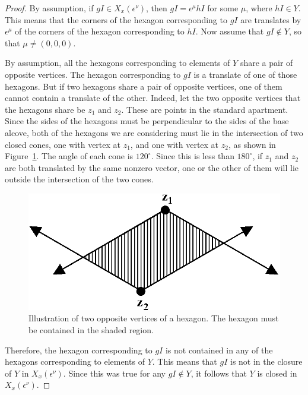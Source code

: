 \documentclass{amsart}
\theoremstyle{definition}
\def\e{\epsilon}
\def\en{\e^{\nu}}
\def\X{X_x(\en)}
\begin{document}
  \begin{proof}
    By assumption, if $gI \in \X$, then $gI = \e^\mu hI$ for some $\mu$, where
    $hI \in Y$.  This means that the corners of the hexagon corresponding to
    $gI$ are translates by $\e^\mu$ of the corners of the hexagon corresponding
    to $hI$.  Now assume that $gI \notin Y$, so that $\mu \neq (0, 0, 0)$.

    By assumption, all the hexagons corresponding to elements of $Y$ share a
    pair of opposite vertices.  The hexagon corresponding to $gI$ is a
    translate of one of those hexagons.  But if two hexagons share a pair of
    opposite vertices, one of them cannot contain a translate of the other.
    Indeed, let the two opposite vertices that the hexagons share be $z_1$ and
    $z_2$.  These are points in the standard apartment.  Since the sides of the
    hexagons must be perpendicular to the sides of the base alcove, both of the
    hexagons we are considering must lie in the intersection of two closed
    cones, one with vertex at $z_1$, and one with vertex at $z_2$, as shown in
    Figure~\ref{fig:cones}.  The angle of each cone is $120^\circ$.  Since this
    is less than $180^\circ$, if $z_1$ and $z_2$ are both translated by the
    same nonzero vector, one or the other of them will lie outside the
    intersection of the two cones.
    \begin{figure}[htbp]
      \begin{center}
	\includegraphics{cones}
      \end{center}
      \caption{Illustration of two opposite vertices of a hexagon.  The hexagon
      must be contained in the shaded region.}
      \label{fig:cones}
    \end{figure}

    Therefore, the hexagon corresponding to $gI$ is not contained in any of the
    hexagons corresponding to elements of $Y$.  This means that $gI$ is not in
    the closure of $Y$ in $\X$.  Since this was true for any $gI \notin Y$, it
    follows that $Y$ is closed in $\X$.
  \end{proof}
\end{document}
